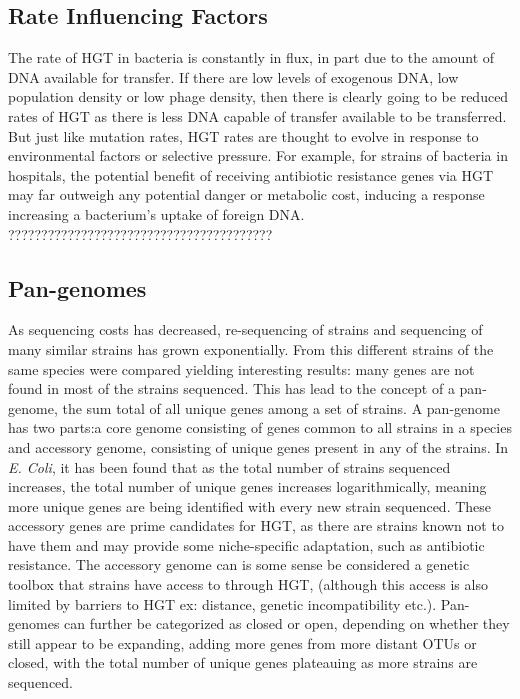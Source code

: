 \documentclass[12pt,letter]{article}
\begin{document}
\subsection{Rate Influencing Factors}
The rate of HGT in bacteria is constantly in flux, in part due to the amount of DNA available for transfer.
If there are low levels of exogenous DNA, low population density or low phage density, then there is clearly going to be reduced rates of HGT as there is less DNA capable of transfer available to be transferred.
But just like mutation rates, HGT rates are thought to evolve in response to environmental factors or selective pressure\citep{mtrate,hgtrate}.
For example, for strains of bacteria in hospitals, the potential benefit of receiving antibiotic resistance genes via HGT may far outweigh any potential danger or metabolic cost, inducing a response increasing a bacterium's uptake of foreign DNA.
????????????????????????????????????????
\subsection{Pan-genomes}%
As sequencing costs has decreased, re-sequencing of strains and sequencing of many similar strains has grown exponentially.
From this different strains of the same species were compared yielding interesting results: many genes are not found in most of the strains sequenced.
This has lead to the concept of a pan-genome, the sum total of all unique genes among a set of strains.
A pan-genome has two parts:a core genome consisting of genes common to all strains in a species and accessory genome, consisting of unique genes present in any of the strains.
In \textit{E. Coli}, it has been found that as the total number of strains sequenced increases, the total number of unique genes increases logarithmically, meaning more unique genes are being identified with every new strain sequenced.
These accessory genes are prime candidates for HGT, as there are strains known not to have them and may provide some niche-specific adaptation, such as antibiotic resistance.
The accessory genome can is some sense be considered a genetic toolbox that strains have access to through HGT, (although this access is also limited by barriers to HGT ex: distance, genetic incompatibility etc.).
Pan-genomes can further be categorized as closed or open, depending on whether they still appear to be expanding, adding more genes from more distant OTUs or closed, with the total number of unique genes plateauing as more strains are sequenced.
\end{document}
